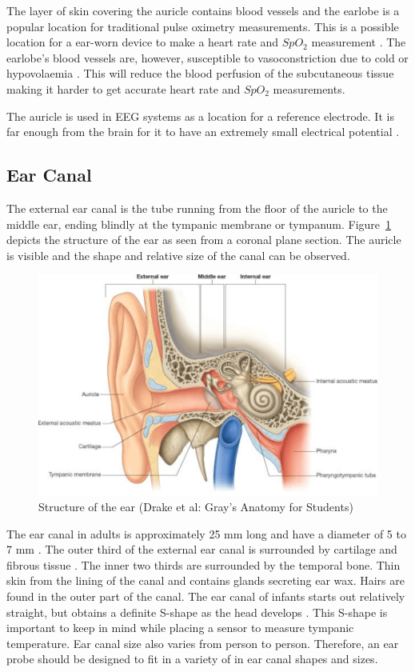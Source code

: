 The layer of skin covering the auricle contains blood vessels and the earlobe is a popular location for traditional pulse oximetry measurements. This is a possible location for a ear-worn device to make a heart rate and $SpO_2$ measurement \citep{poh2010motion}. The earlobe's blood vessels are, however, susceptible to vasoconstriction due to cold or hypovolaemia \citep{WHO2011UsingPulseOxi}. This will reduce the blood perfusion of the subcutaneous tissue making it harder to get accurate heart rate and $SpO_2$ measurements.

\medskip
The auricle is used in EEG systems as a location for a reference electrode. It is far enough from the brain for it to have an extremely small electrical potential \citep{nunez2006electric}.

\subsection{Ear Canal}
The external ear canal is the tube running from the floor of the auricle to the middle ear, ending blindly at the tympanic membrane or tympanum. Figure~\ref{fig:EarSection} depicts the structure of the ear as seen from a coronal plane section. The auricle is visible and the shape and relative size of the canal can be observed.

\medskip

\begin{figure}
   \centering
   \includegraphics[scale=0.7]{figs/EarSection}
   \caption{Structure of the ear (Drake et al: Gray's Anatomy for Students)}
   \label{fig:EarSection}
\end{figure}
 
The ear canal in adults is approximately 25 mm long and have a diameter of 5 to 7 mm \citep{alvord1997anatomy}. The outer third of the external ear canal is surrounded by cartilage and fibrous tissue \citep{ExternalAuditoryCanal}. The inner two thirds are surrounded by the temporal bone. Thin skin from the lining of the canal and contains glands secreting ear wax. Hairs are found in the outer part of the canal. The ear canal of infants starts out relatively straight, but obtains a definite S-shape as the head develops \citep{alvord1997anatomy}. This S-shape is important to keep in mind while placing a sensor to measure tympanic temperature. Ear canal size also varies from person to person. Therefore, an ear probe should be designed to fit in a variety of in ear canal shapes and sizes.

